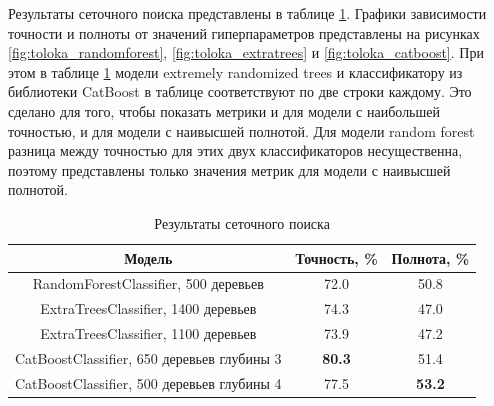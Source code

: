 Результаты сеточного поиска представлены в таблице \ref{tab:toloka_grid_search}. Графики зависимости точности и полноты от значений гиперпараметров представлены на рисунках \ref{fig:toloka_randomforest}, \ref{fig:toloka_extratrees} и \ref{fig:toloka_catboost}. При этом в таблице \ref{tab:toloka_grid_search} модели extremely randomized trees и классификатору из библиотеки CatBoost в таблице соответствуют по две строки каждому. Это сделано для того, чтобы показать метрики и для модели с наибольшей точностью, и для модели с наивысшей полнотой. Для модели random forest разница между точностью для этих двух классификаторов несущественна, поэтому представлены только значения метрик для модели с наивысшей полнотой.

\begin{table}[h]
    \centering
    \begin{tabular}{|c|c|c|}
        \hline
        Модель & Точность, \% & Полнота, \% \\
        \hline
        RandomForestClassifier, 500 деревьев & 72.0 & 50.8 \\
        \hline
        ExtraTreesClassifier, 1400 деревьев & 74.3 & 47.0 \\
        \hline
        ExtraTreesClassifier, 1100 деревьев & 73.9 & 47.2 \\
        \hline
        CatBoostClassifier, 650 деревьев глубины 3 & \textbf{80.3} & 51.4 \\
        \hline
        CatBoostClassifier, 500 деревьев глубины 4 & 77.5 & \textbf{53.2} \\
        \hline
    \end{tabular}
    \caption{Результаты сеточного поиска}
    \label{tab:toloka_grid_search}
\end{table}

